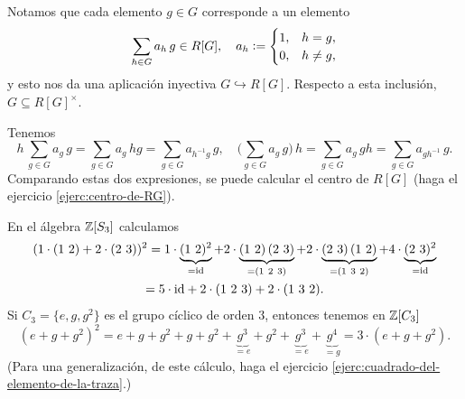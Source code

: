 Notamos que cada elemento $g\in G$ corresponde a un elemento
\[ \sum_{h\in G} a_h\,g \in R [G], \quad
  a_h \mathrel{\mathop:}= \begin{cases}
    1, & h = g,\\
    0, & h \ne g,
  \end{cases} \]
y esto nos da una aplicación inyectiva $G \hookrightarrow R [G]$. Respecto
a esta inclusión, $G \subseteq R [G]^\times$.

Tenemos
\[ h\,\sum_{g\in G} a_g\,g =
   \sum_{g\in G} a_g\,hg =
   \sum_{g\in G} a_{h^{-1}g}\,g, \quad
   \Bigr(\sum_{g\in G} a_g\,g\Bigr)\,h =
   \sum_{g\in G} a_g\,gh =
   \sum_{g\in G} a_{gh^{-1}}\,g. \]
Comparando estas dos expresiones, se puede calcular el centro de $R [G]$
(haga el ejercicio \ref{ejerc:centro-de-RG}).

\begin{ejemplo}
  En el álgebra $\mathbb{Z} [S_3]$ calculamos
  \begin{multline*}
    (1\cdot (1~2) + 2\cdot (2~3))^2 =
    1\cdot \underbrace{(1~2)^2}_{= \mathrm{id}} +
    2\cdot \underbrace{(1~2)\,(2~3)}_{= (1~2~3)} +
    2\cdot \underbrace{(2~3)\,(1~2)}_{= (1~3~2)} +
    4\cdot \underbrace{(2~3)^2}_{= \mathrm{id}} \\
    = 5\cdot \mathrm{id} + 2\cdot (1~2~3) + 2\cdot (1~3~2).
  \end{multline*}
  Si $C_3 = \{ e, g, g^2 \}$ es el grupo cíclico de orden $3$, entonces tenemos
  en $\mathbb{Z} [C_3]$
  \[ (e + g + g^2)^2 =
     e + g + g^2 + g + g^2 + \underbrace{g^3}_{= e} + g^2 +
     \underbrace{g^3}_{= e} + \underbrace{g^4}_{= g} = 3\cdot (e + g + g^2). \]
  (Para una generalización, de este cálculo, haga el ejercicio
  \ref{ejerc:cuadrado-del-elemento-de-la-traza}.)
\end{ejemplo}

